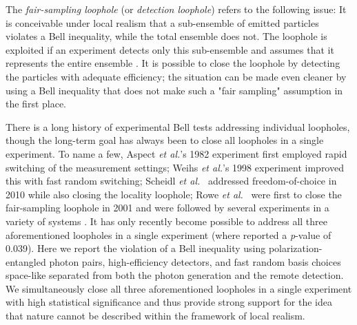 \documentclass[superscriptaddress,twocolumn]{revtex4-1}
\begin{document}
The \textit{fair-sampling loophole} (or \textit{detection loophole}) refers to the following issue: It is conceivable 
under local realism that a sub-ensemble of emitted particles violates a Bell inequality, while the total ensemble does not. The loophole is exploited if an experiment detects only this sub-ensemble and assumes that it represents the entire ensemble \cite{Pearle1970}. It is possible to close the loophole by detecting the particles with adequate efficiency; the situation can be made even cleaner by using a Bell inequality that does not make such a "fair sampling" assumption in the first place.

There is a long history \cite{Brunner2014, LarssonLoopholes2014} of experimental Bell tests \cite{Freedman1972,Aspect1982,Weihs1998,Rowe2001,Matsukevich2008,Hofmann2012,Ansmann2009,Scheidl2010,Aguero2012,Giustina2013a,Christensen2013,Hensen2015} addressing individual loopholes,  though the long-term goal has always been to close all loopholes in a single experiment. To name a few, Aspect \textit{et al.}'s 1982 experiment \cite{Aspect1982} first employed rapid switching of the measurement settings; Weihs \textit{et al.}'s 1998 experiment \cite{Weihs1998} improved this with fast random switching; Scheidl \textit{et al.}\ \cite{Scheidl2010} addressed  freedom-of-choice in 2010 while also closing the locality loophole; Rowe \textit{et al.}\ \cite{Rowe2001} were first to close the fair-sampling loophole in 2001 and were followed by several experiments in a variety of systems \cite{Matsukevich2008,Ansmann2009,Giustina2013a,Christensen2013,Hensen2015}. 
It has only recently become possible to address all three aforementioned loopholes in a single experiment \cite{Hensen2015,NIST2015} (where \cite{Hensen2015} reported a \textit{p}-value of 0.039). 
Here we report the violation of a Bell inequality using polarization-entangled photon pairs, high-efficiency detectors, and fast random basis choices space-like separated from both the photon generation and the remote detection. We simultaneously close all three aforementioned loopholes in a single experiment with high statistical significance and thus provide strong support for the idea that nature cannot be described within the framework of local realism.
	

	
\end{document}
